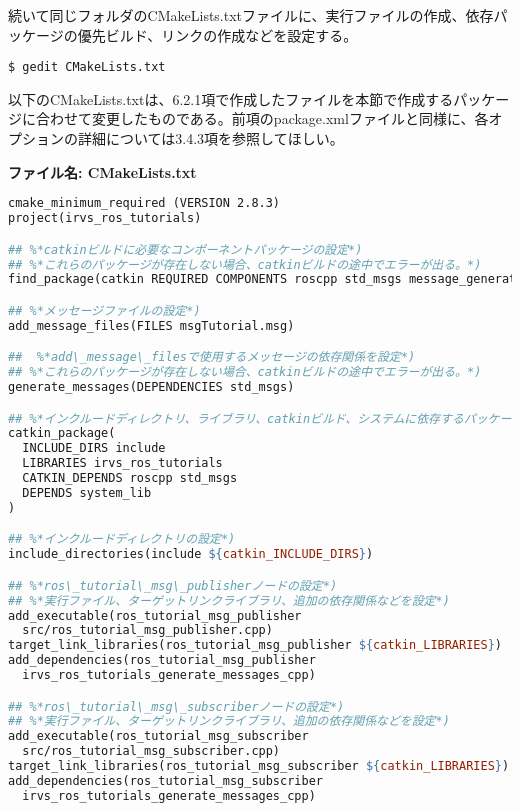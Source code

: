 続いて同じフォルダのCMakeLists.txtファイルに、実行ファイルの作成、依存パッケージの優先ビルド、リンクの作成などを設定する。

\begin{lstlisting}[language=ROS]
$ gedit CMakeLists.txt
\end{lstlisting}

以下のCMakeLists.txtは、6.2.1項で作成したファイルを本節で作成するパッケージに合わせて変更したものである。前項のpackage.xmlファイルと同様に、各オプションの詳細については3.4.3項を参照してほしい。

\noindent\textbf{ファイル名: CMakeLists.txt}
\begin{lstlisting}[language=make]
cmake_minimum_required (VERSION 2.8.3)
project(irvs_ros_tutorials)

## %*catkinビルドに必要なコンポーネントパッケージの設定*)
## %*これらのパッケージが存在しない場合、catkinビルドの途中でエラーが出る。*)
find_package(catkin REQUIRED COMPONENTS roscpp std_msgs message_generation)

## %*メッセージファイルの設定*)
add_message_files(FILES msgTutorial.msg)

##  %*add\_message\_filesで使用するメッセージの依存関係を設定*)
## %*これらのパッケージが存在しない場合、catkinビルドの途中でエラーが出る。*)
generate_messages(DEPENDENCIES std_msgs)

## %*インクルードディレクトリ、ライブラリ、catkinビルド、システムに依存するパッケージの指定*)
catkin_package(
  INCLUDE_DIRS include
  LIBRARIES irvs_ros_tutorials
  CATKIN_DEPENDS roscpp std_msgs
  DEPENDS system_lib
)

## %*インクルードディレクトリの設定*)
include_directories(include ${catkin_INCLUDE_DIRS})

## %*ros\_tutorial\_msg\_publisherノードの設定*)
## %*実行ファイル、ターゲットリンクライブラリ、追加の依存関係などを設定*)
add_executable(ros_tutorial_msg_publisher
  src/ros_tutorial_msg_publisher.cpp)
target_link_libraries(ros_tutorial_msg_publisher ${catkin_LIBRARIES})
add_dependencies(ros_tutorial_msg_publisher
  irvs_ros_tutorials_generate_messages_cpp)

## %*ros\_tutorial\_msg\_subscriberノードの設定*)
## %*実行ファイル、ターゲットリンクライブラリ、追加の依存関係などを設定*)
add_executable(ros_tutorial_msg_subscriber
  src/ros_tutorial_msg_subscriber.cpp)
target_link_libraries(ros_tutorial_msg_subscriber ${catkin_LIBRARIES})
add_dependencies(ros_tutorial_msg_subscriber
  irvs_ros_tutorials_generate_messages_cpp)
\end{lstlisting}

